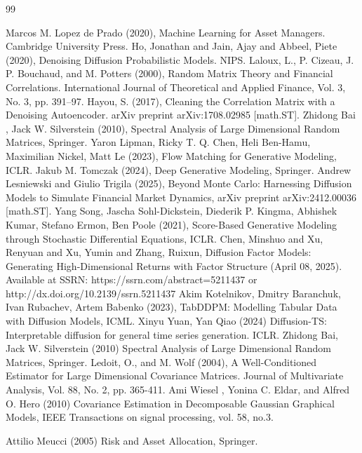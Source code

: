 \documentclass{article}
\begin{document}
\begin{thebibliography}{99}

   Marcos M. Lopez de Prado (2020),  Machine Learning for Asset Managers.  Cambridge University Press.
  Ho, Jonathan and Jain, Ajay and Abbeel, Piete (2020), Denoising Diffusion Probabilistic Models. NIPS.
  Laloux, L., P. Cizeau, J. P. Bouchaud, and M. Potters (2000), Random Matrix Theory and Financial Correlations. International Journal of Theoretical and
Applied Finance, Vol. 3, No. 3, pp. 391–97.
 Hayou, S. (2017), Cleaning the Correlation Matrix with a Denoising Autoencoder. arXiv preprint arXiv:1708.02985 [math.ST].
  Zhidong Bai , Jack W. Silverstein (2010), Spectral Analysis of Large Dimensional Random Matrices, Springer.
 Yaron Lipman,  Ricky T. Q. Chen,  Heli Ben-Hamu, Maximilian Nickel,  Matt Le (2023), Flow Matching for Generative Modeling, ICLR.
 Jakub M. Tomczak  (2024), Deep Generative Modeling, Springer.
 Andrew Lesniewski and Giulio Trigila (2025), Beyond Monte Carlo: Harnessing Diffusion Models
to Simulate Financial Market Dynamics,  arXiv preprint arXiv:2412.00036 [math.ST].
 Yang Song, Jascha Sohl-Dickstein, Diederik P. Kingma, Abhishek Kumar, Stefano Ermon, Ben Poole (2021), Score-Based Generative Modeling through Stochastic Differential Equations, ICLR.
 Chen, Minshuo and Xu, Renyuan and Xu, Yumin and Zhang, Ruixun, Diffusion Factor Models: Generating High-Dimensional Returns with Factor Structure (April 08, 2025). Available at SSRN: https://ssrn.com/abstract=5211437 or http://dx.doi.org/10.2139/ssrn.5211437
Akim Kotelnikov, Dmitry Baranchuk, Ivan Rubachev, Artem Babenko (2023), TabDDPM: Modelling Tabular Data with Diffusion Models, ICML.
  Xinyu Yuan, Yan Qiao (2024) Diffusion-TS: Interpretable diffusion for general time series generation. ICLR.
 Zhidong Bai, Jack W. Silverstein (2010)
Spectral Analysis of Large Dimensional Random Matrices, Springer.
 Ledoit, O., and M. Wolf (2004), A Well-Conditioned Estimator for Large Dimensional Covariance Matrices. Journal of Multivariate Analysis, Vol. 88, No. 2, pp. 365-411.
 Ami Wiesel , Yonina C. Eldar, and Alfred O. Hero (2010)  Covariance Estimation in Decomposable Gaussian
Graphical Models, IEEE Transactions on signal processing, vol. 58, no.3. 

 Attilio Meucci (2005) Risk and Asset Allocation,  Springer.

\end{thebibliography}
 
\end{document}
